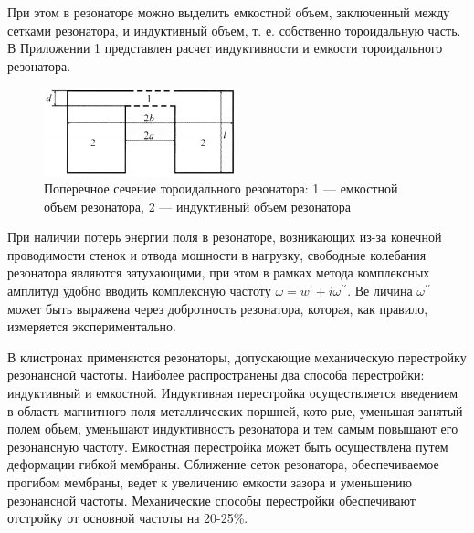 При этом в резонаторе можно выделить емкостной объем, заключенный
между сетками резонатора, и индуктивный объем, т. е. собственно торои­дальную часть. В Приложении 1 представлен расчет индуктивности и емко­сти тороидального резонатора.

\begin{figure}[h!]
	\centering
	\includegraphics[width=0.5\textwidth]{fig/fig2}
	\caption{Поперечное сечение тороидального резонатора: 1 — емкостной объем резонатора, 2 — индуктивный объем резонатора}
	\label{fig:potential_well}
\end{figure}

При наличии потерь энергии поля в резонаторе, возникающих из-за ко­нечной проводимости стенок и отвода мощности в нагрузку, свободные ко­лебания резонатора являются затухающими, при этом в рамках метода ком­плексных амплитуд удобно вводить комплексную частоту 
$\omega = w ^ { \prime } + i \omega ^ { \prime \prime }$. Ве­
личина $\omega ^ { \prime \prime }$ может быть выражена через добротность резонатора, которая,
как правило, измеряется экспериментально.

В клистронах применяются резонаторы, допускающие механическую пе­рестройку резонансной частоты. Наиболее распространены два способа пе­рестройки: индуктивный и емкостной. Индуктивная перестройка осуществ­ляется введением в область магнитного поля металлических поршней, кото­
рые, уменьшая занятый полем объем, уменьшают индуктивность резонато­ра и тем самым повышают его резонансную частоту. Емкостная перестройка
может быть осуществлена путем деформации гибкой мембраны. Сближение
сеток резонатора, обеспечиваемое прогибом мембраны, ведет к увеличению
емкости зазора и уменьшению резонансной частоты. Механические способы
перестройки обеспечивают отстройку от основной частоты на 20-25\%.
